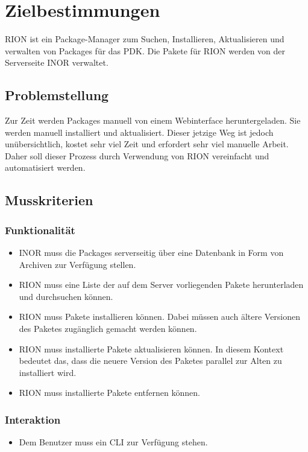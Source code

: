 \chapter{Zielbestimmungen}

RION ist ein Package-Manager zum Suchen, Installieren, Aktualisieren und verwalten von Packages für das PDK. Die Pakete für RION werden von der Serverseite INOR verwaltet.

\section{Problemstellung}
Zur Zeit werden Packages manuell von einem Webinterface heruntergeladen. Sie werden manuell installiert und aktualisiert. Dieser jetzige Weg ist jedoch unübersichtlich, kostet sehr viel Zeit und erfordert sehr viel manuelle Arbeit. Daher soll dieser Prozess durch Verwendung von RION vereinfacht und automatisiert werden.

\section{Musskriterien}
\subsection{Funktionalität}
\begin{itemize}
		\item INOR muss die Packages serverseitig über eine Datenbank in Form von Archiven zur Verfügung stellen.
		\item RION muss eine Liste der auf dem Server vorliegenden Pakete herunterladen und durchsuchen können.
		\item RION muss Pakete installieren können. Dabei müssen auch ältere Versionen des Paketes zugänglich gemacht werden können.
		\item RION muss installierte Pakete aktualisieren können. In diesem Kontext bedeutet das, dass die neuere Version des Paketes parallel zur Alten zu installiert wird.
		\item RION muss installierte Pakete entfernen können.
\end{itemize}

\subsection{Interaktion}


\begin{itemize}
	\item Dem Benutzer muss ein CLI zur Verfügung stehen.
\end{itemize}

